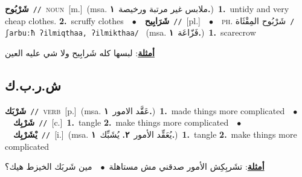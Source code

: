 \documentclass[10pt,a4paper,twoside]{article} %
\begin{document}
\begin{multicols}{2}
{\setlength\topsep{0pt}\textbf{\foreignlanguage{arabic}{شَرْبُوح}}\ {\color{gray}\texttt{//}\color{black}}\ \textsc{noun}\ [m.]\ \color{gray}(msa. \foreignlanguage{arabic}{ملابس غير مرتبة ورخيصة}~\foreignlanguage{arabic}{\textbf{١.}})\color{black}\ \textbf{1.}~untidy and very cheap clothes.  \textbf{2.}~scruffy clothes\ \ $\bullet$\ \ \setlength\topsep{0pt}\textbf{\foreignlanguage{arabic}{شَرَابِيح}}\ {\color{gray}\texttt{//}\color{black}}\ [pl.]\ \ $\bullet$\ \ \textsc{ph.} \color{gray} \foreignlanguage{arabic}{شَرْبُوح المِقْثَاة}\color{black}\ {\color{gray}\texttt{/{\sffamily ʃarbuːħ ʔilmiqthaa, ʔilmikthaa}/}\color{black}}\ \color{gray} (msa. \foreignlanguage{arabic}{فَزّاعَة}~\foreignlanguage{arabic}{\textbf{١.}})\color{black}\ \textbf{1.}~scarecrow\  \begin{flushright}\color{gray}\foreignlanguage{arabic}{\textbf{\underline{\foreignlanguage{arabic}{أمثلة}}}: لبسها كله شَرابِيح ولا شي عليه العين}\end{flushright}\color{black}} \vspace{2mm}

\vspace{-3mm}
\subsection*{\color{blue}\foreignlanguage{arabic}{ش.ر.ب.ك}\color{blue}{}} 

{\setlength\topsep{0pt}\textbf{\foreignlanguage{arabic}{شَرْبَك}}\ {\color{gray}\texttt{//}\color{black}}\ \textsc{verb}\ [p.]\ \color{gray}(msa. \foreignlanguage{arabic}{عَقَّد الامور}~\foreignlanguage{arabic}{\textbf{١.}})\color{black}\ \textbf{1.}~made things more complicated\ \ $\bullet$\ \ \setlength\topsep{0pt}\textbf{\foreignlanguage{arabic}{شَرْبِك}}\ {\color{gray}\texttt{//}\color{black}}\ [c.]\ \textbf{1.}~tangle  \textbf{2.}~make things more complicated\ \ $\bullet$\ \ \setlength\topsep{0pt}\textbf{\foreignlanguage{arabic}{يْشَرْبِك}}\ {\color{gray}\texttt{//}\color{black}}\ [i.]\ \color{gray}(msa. \foreignlanguage{arabic}{يُعَقِّد الأمور}~\foreignlanguage{arabic}{\textbf{٢.}}  \foreignlanguage{arabic}{يُشَبِّك}~\foreignlanguage{arabic}{\textbf{١.}})\color{black}\ \textbf{1.}~tangle  \textbf{2.}~make things more complicated\  \begin{flushright}\color{gray}\foreignlanguage{arabic}{\textbf{\underline{\foreignlanguage{arabic}{أمثلة}}}: تشَربِكِش الأمور صدقني مش مستاهلة\ $\bullet$\ \  مين شَربَك الخيزط هيك؟}\end{flushright}\color{black}} \vspace{2mm}


\end{multicols}
\end{document}
